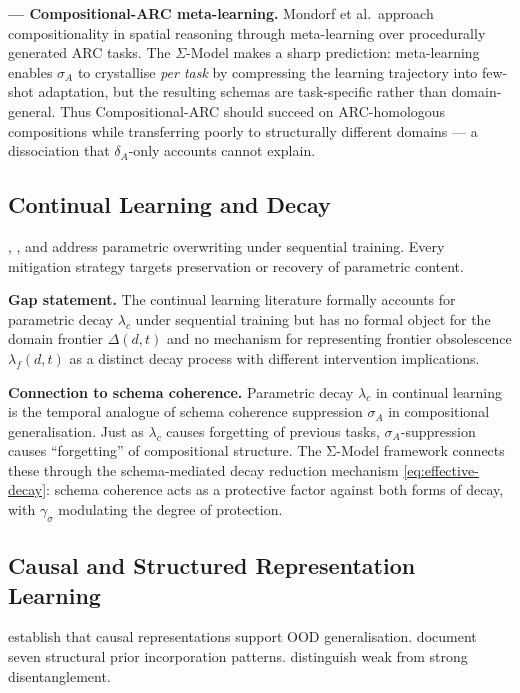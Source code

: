 \documentclass[11pt]{article}
\theoremstyle{definition}
\theoremstyle{plain}
\begin{document}
\textbf{\cite{mondorf2026compositionalarc} --- Compositional-ARC meta-learning.}
Mondorf et al.~approach compositionality in spatial reasoning through meta-learning
over procedurally generated ARC tasks. The $\Sigma$-Model makes a sharp prediction:
meta-learning enables $\sigma_A$ to crystallise \emph{per task} by compressing the
learning trajectory into few-shot adaptation, but the resulting schemas are
task-specific rather than domain-general. Thus Compositional-ARC should succeed on
ARC-homologous compositions while transferring poorly to structurally different
domains --- a dissociation that $\delta_A$-only accounts cannot explain.

\subsection{Continual Learning and Decay}\label{sec:continual-learning}

\cite{mccloskey1989catastrophicinterference},
\cite{goodfellow2013empiricalinvestigationcatastrophicforgetting}, and
\cite{kirkpatrick2017overcomingcatastrophicforgetting} address parametric
overwriting under sequential training. Every mitigation strategy targets
preservation or recovery of parametric content.

\textbf{Gap statement.} The continual learning literature formally
accounts for parametric decay $\lambda_c$ under sequential training but
has no formal object for the domain frontier $\Delta(d,t)$ and no
mechanism for representing frontier obsolescence $\lambda_f(d,t)$ as a
distinct decay process with different intervention implications.

\textbf{Connection to schema coherence.} Parametric decay $\lambda_c$ in
continual learning is the temporal analogue of schema coherence suppression
$\sigma_A$ in compositional generalisation. Just as $\lambda_c$ causes
forgetting of previous tasks, $\sigma_A$-suppression causes ``forgetting''
of compositional structure. The Σ-Model framework connects these through the
schema-mediated decay reduction mechanism \eqref{eq:effective-decay}:
schema coherence acts as a protective factor against both forms of decay,
with $\gamma_\sigma$ modulating the degree of protection.

\subsection{Causal and Structured Representation Learning}\label{sec:causal-repr}

\cite{scholkopf2021towardcausalrepresentationlearning} establish that
causal representations support OOD generalisation.
\cite{mohan2024structureindrlsurveyopenproblems} document seven structural
prior incorporation patterns. \cite{torresan2024disentangledrepresentationscausalcognition}
distinguish weak from strong disentanglement.
\end{document}
